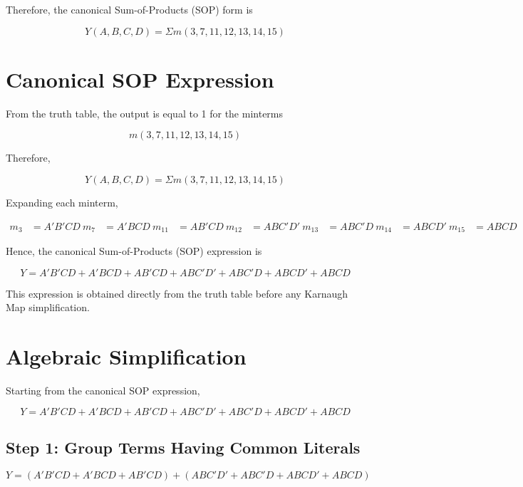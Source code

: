 \documentclass[12pt,a4paper]{article}
\begin{document}
Therefore, the canonical Sum-of-Products (SOP) form is

\begin{equation}
Y(A,B,C,D)=\Sigma m(3,7,11,12,13,14,15)
\end{equation}
\section*{Canonical SOP Expression}

From the truth table, the output is equal to 1 for the minterms

\begin{equation}
m(3,7,11,12,13,14,15)
\end{equation}

Therefore,

\begin{equation}
Y(A,B,C,D)=\Sigma m(3,7,11,12,13,14,15)
\end{equation}

Expanding each minterm,

\begin{align}
m_3 &= A'B'CD \
m_7 &= A'BCD \
m_{11} &= AB'CD \
m_{12} &= ABC'D' \
m_{13} &= ABC'D \
m_{14} &= ABCD' \
m_{15} &= ABCD
\end{align}

Hence, the canonical Sum-of-Products (SOP) expression is

\begin{equation}
Y=
A'B'CD+
A'BCD+
AB'CD+
ABC'D'+
ABC'D+
ABCD'+
ABCD
\end{equation}

This expression is obtained directly from the truth table before any Karnaugh Map simplification.

\section*{Algebraic Simplification}

Starting from the canonical SOP expression,

\begin{equation}
Y=
A'B'CD+
A'BCD+
AB'CD+
ABC'D'+
ABC'D+
ABCD'+
ABCD
\end{equation}

\subsection*{Step 1: Group Terms Having Common Literals}

\begin{equation}
Y=
(A'B'CD+A'BCD+AB'CD)
+
(ABC'D'+ABC'D+ABCD'+ABCD)
\end{equation}
\end{document}
